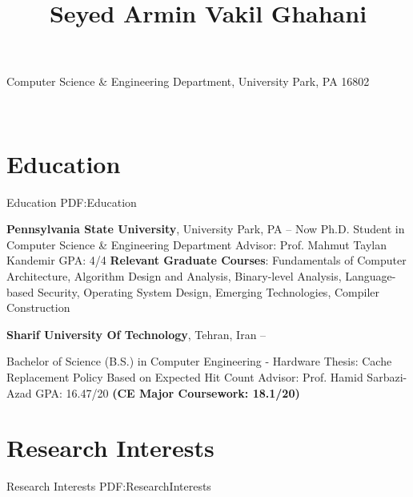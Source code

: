 \documentclass[a4paper,9pt,oneside]{article}
\newcommand{\CVAuthor}{Seyed Armin Vakil Ghahani}
\begin{document}

\title{\CVAuthor}
\begin{subtitle}

\faInstitution Computer Science \& Engineering Department, University Park, PA 16802
\par
\Large{
\href{https://arminvakil.github.io/}{\faGlobe}
\href{mailto:arminvakil@psu.edu}{\faEnvelope}
\href{https://www.linkedin.com/in/arminvakil}{\faLinkedinSquare}
\href{https://github.com/arminvakil}{\faGithubSquare}
\href{https://scholar.google.com/citations?user=OHnTCysAAAAJ&hl=en}{\faGraduationCap}}
\
\end{subtitle}

\begin{body}


\section
{Education}
{Education}
{PDF:Education}

\textbf{Pennsylvania State University},
University Park, PA
\hfill
{} --
Now
\GapNoBreak
\BulletItem
Ph.D. Student in
Computer Science \& Engineering Department
\SubBulletItem
Advisor: Prof. Mahmut Taylan Kandemir
\SubBulletItem
GPA: 4/4
\SubBulletItem
\textbf{Relevant Graduate Courses}: Fundamentals of Computer Architecture, Algorithm Design and Analysis, Binary-level Analysis, Language-based Security, Operating System Design, Emerging Technologies, Compiler Construction

\BigGap

\textbf{Sharif University Of Technology},
Tehran, Iran
\hfill
{} --

\GapNoBreak
\BulletItem
Bachelor of Science (B.S.) in
Computer Engineering - Hardware
\SubBulletItem
Thesis: Cache Replacement Policy Based on Expected Hit Count
\newline
Advisor: Prof. Hamid Sarbazi-Azad
\SubBulletItem
GPA: 16.47/20 \textbf{(CE Major Coursework: 18.1/20)}



\section
{Research Interests}
{Research Interests}
{PDF:ResearchInterests}


\end{body}
\end{document}
